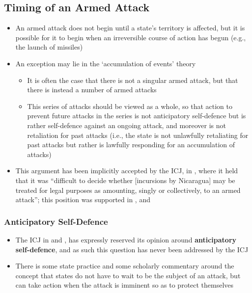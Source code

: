 \subsection{Timing of an Armed Attack}
\begin{itemize}
    \item An armed attack does not begin until a state's territory is affected, but it is possible for it to begin when an irreversible course of action has begun (e.g., the launch of missiles)
    \item An exception may lie in the `accumulation of events' theory
    \begin{itemize}
        \item It is often the case that there is not a singular armed attack, but that there is instead a number of armed attacks
        \item This series of attacks should be viewed as a whole, so that action to prevent future attacks in the series is not anticipatory self-defence but is rather self-defence against an ongoing attack, and moreover is not retaliation for past attacks (i.e., the state is not unlawfully retaliating for past attacks but rather is lawfully responding for an accumulation of attacks)
    \end{itemize}
    \item This argument has been implicitly accepted by the ICJ, in , where it held that it was ``difficult to decide whether [incursions by Nicaragua] may be treated for legal purposes as amounting, singly or collectively, to an armed attack''; this position was supported in , and 
\end{itemize}

\subsubsection{Anticipatory Self-Defence}
\begin{itemize}
    \item The ICJ in  and , has expressly reserved its opinion around \textbf{anticipatory self-defence}, and as such this question has never been addressed by the ICJ
    \item There is some state practice and some scholarly commentary around the concept that states do not have to wait to be the subject of an attack, but can take action when the attack is imminent so as to protect themselves
\end{itemize}

